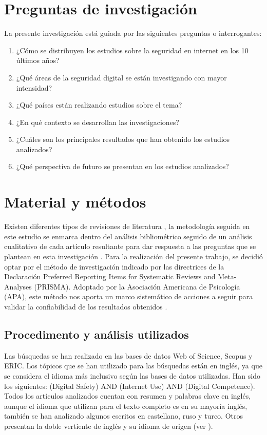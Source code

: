 \documentclass[spanish]{textolivre}
\begin{document}
\section{Preguntas de investigación}\label{sec-normas}
La presente investigación está guiada por las siguientes preguntas o interrogantes:

\begin{enumerate}
    \item ¿Cómo se distribuyen los estudios sobre la seguridad en internet en los 10 últimos años?
    \item ¿Qué áreas de la seguridad digital se están investigando con mayor intensidad?
    \item ¿Qué países están realizando estudios sobre el tema?
    \item ¿En qué contexto se desarrollan las investigaciones?
    \item ¿Cuáles son los principales resultados que han obtenido los estudios analizados?
    \item ¿Qué perspectiva de futuro se presentan en los estudios analizados?
\end{enumerate}

\section{Material y métodos}\label{sec-conduta}
Existen diferentes tipos de revisiones de literatura \cite{grant2009typology}, la metodología seguida en este estudio se enmarca dentro del análisis bibliométrico seguido de un análisis cualitativo de cada artículo resultante para dar respuesta a las preguntas que se plantean en esta investigación \cite{delgado2023revision}. Para la realización del presente trabajo, se decidió optar por el método de investigación indicado por las directrices de la Declaración Preferred Reporting Items for Systematic Reviews and Meta-Analyses (PRISMA). Adoptado por la Asociación Americana de Psicología (APA), este método nos aporta un marco sistemático de acciones a seguir para validar la confiabilidad de los resultados obtenidos \cite{yepez2021declaracion}.   

\subsection{Procedimento y análisis utilizados}
Las búsquedas se han realizado en las bases de datos Web of Science, Scopus y ERIC. Los tópicos que se han utilizado para las búsquedas están en inglés, ya que se considera el idioma más inclusivo según las bases de datos utilizadas. Han sido los siguientes: (Digital Safety) AND (Internet Use) AND (Digital Competence). Todos los artículos analizados cuentan con resumen y palabras clave en inglés, aunque el idioma que utilizan para el texto completo es en su mayoría inglés, también se han analizado algunos escritos en castellano, ruso y turco. Otros presentan la doble vertiente de inglés y su idioma de origen (ver ).
\end{document}
